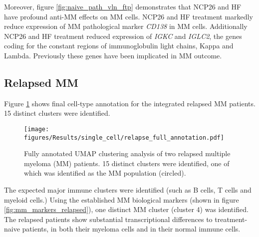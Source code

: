Moreover, figure \ref{fig:naive_path_vln_ftp} demonstrates that NCP26 and HF have profound anti-MM effects on MM cells.
NCP26 and HF treatment markedly reduce expression of MM pathological marker \textit{CD138} in MM cells.
Additionally NCP26 and HF treatment reduced expression of \textit{IGKC} and \textit{IGLC2}, the genes coding for the constant regions of immunoglobulin light chains, Kappa and Lambda.
Previously these genes have been implicated in MM outcome.



\clearpage
\subsection{Relapsed MM}
Figure \ref{fig:full_anno_relapse} shows final cell-type annotation for the integrated relapsed MM patients.
15 distinct clusters were identified.
\begin{figure}[hpt]
\centering
\texttt{[image: figures/Results/single\_cell/relapse\_full\_annotation.pdf]}
\caption[Relapsed MM scRNA-seq full annotation]{Fully annotated UMAP clustering analysis of two relapsed multiple myeloma (MM) patients.
15 distinct clusters were identified, one of which was identified as the MM population (circled).}
\label{fig:full_anno_relapse}
\end{figure}
The expected major immune clusters were identified (such as B cells, T cells and myeloid cells.)
Using the established MM biological markers (shown in figure \ref{fig:mm_markers_relapsed}), one distinct MM cluster (cluster 4) was identified.
The relapsed patients show substantial transcriptional differences to treatment-naive patients, in both their myeloma cells and in their normal immune cells.



